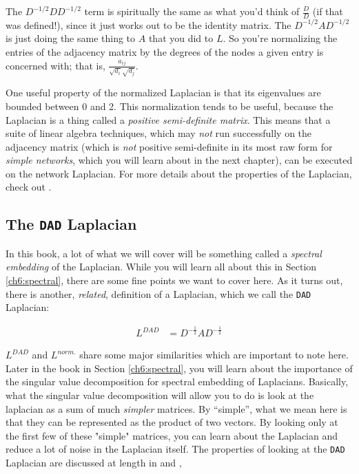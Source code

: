 The $D^{-1/2} D D^{-1/2}$ term is spiritually the same as what you'd think of $\frac{D}{D}$ (if that was defined!), since it just works out to be the identity matrix. The $D^{-1/2} A D^{-1/2}$ is just doing the same thing to $A$ that you did to $L$. So you're normalizing the entries of the adjacency matrix by the degrees of the nodes a given entry is concerned with; that is, $\frac{a_{ij}}{\sqrt{d_i}\sqrt{d_j}}$.

One useful property of the normalized Laplacian is that its eigenvalues are bounded between 0 and 2. This normalization tends to be useful, because the Laplacian is a thing called a \emph{positive semi-definite matrix}. This means that a suite of linear algebra techniques, which may \emph{not} run successfully on the adjacency matrix (which is \emph{not} positive semi-definite in its most raw form for \emph{simple networks}, which you will learn about in the next chapter), can be executed on the network Laplacian. For more details about the properties of the Laplacian, check out \cite{Li2014Dec}.

\subsection{The \texttt{DAD} Laplacian}
\label{sec:ch4:mtx-rep:dad_laplacian}

In this book, a lot of what we will cover will be something called a \emph{spectral embedding} of the Laplacian. While you will learn all about this in Section \ref{ch6:spectral}, there are some fine points we want to cover here. As it turns out, there is another, \emph{related}, definition of a Laplacian, which we call the \texttt{DAD} Laplacian:

\begin{align*}
    L^{DAD} &= D^{-\frac{1}{2}}A D^{-\frac{1}{2}}
\end{align*}

$L^{DAD}$ and $L^{norm.}$ share some major similarities which are important to note here. Later in the book in Section \ref{ch6:spectral}, you will learn about the importance of the singular value decomposition for spectral embedding of Laplacians. Basically, what the singular value decomposition will allow you to do is look at the laplacian as a sum of much \emph{simpler} matrices. By ``simple'', what we mean here is that they can be represented as the product of two vectors. By looking only at the first few of these "simple" matrices, you can learn about the Laplacian and reduce a lot of noise in the Laplacian itself. The properties of looking at the \texttt{DAD} Laplacian are discussed at length in \cite{Chaudhuri2012Jun} and \cite{Amini2012Jul},


